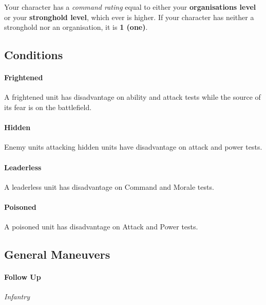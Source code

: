 \documentclass[letterpaper,twocolumn,openany,nodeprecatedcode]{dndbook}
\begin{document}
Your character has a \textit{command rating} equal to either your \textbf{organisations level} or your \textbf{stronghold level},
which ever is higher.
If your character has neither a stronghold nor an organisation, it is \textbf{1 (one)}.

\subsection{Conditions}


\paragraph{Frightened}
A frightened unit has disadvantage on ability and attack tests while the source of its fear is on the battlefield.

\paragraph{Hidden}
Enemy units attacking hidden units have disadvantage on attack and power tests.

\paragraph{Leaderless}
A leaderless unit has disadvantage on Command and Morale tests.

\paragraph{Poisoned}
A poisoned unit has disadvantage on Attack and Power tests.

\subsection{General Maneuvers}

\paragraph{Follow Up}
\textit{Infantry}
\end{document}
